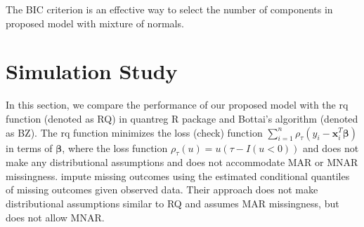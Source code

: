 \documentclass[useAMS,usenatbib,referee]{biom}
\begin{document}

The BIC criterion is an effective way to select the number of components in proposed model with mixture of normals.

\section{Simulation Study}
\label{ch3:sec:simulation}
In this section,
we compare the performance of our proposed model with the rq function (denoted as RQ) in quantreg R package \citep{quantreg} and Bottai's algorithm \citep{bottai2013} (denoted as BZ).
The rq function minimizes the loss (check) function $\sum_{i=1}^n \rho_{\tau} (y_i - \bm x_i^T \bm \beta)$ in terms of $\bm \beta$,
where the loss function $\rho_{\tau} (u) = u(\tau - I(u < 0))$ and does not make any distributional assumptions and does not accommodate MAR or MNAR missingness.
\citet{bottai2013} impute missing outcomes using the estimated conditional quantiles of missing outcomes given observed data.
Their approach does not make distributional assumptions similar to RQ and assumes MAR missingness, but does not allow MNAR.
\end{document}
